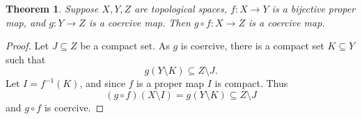 \documentclass[12pt]{article}
\newtheorem{thm}{Theorem}
\begin{document}
\begin{thm} Suppose $X,Y,Z$ are topological spaces,
$f\colon X\to Y$ is a bijective proper map, and 
$g\colon Y\to Z$ is a coercive map.
Then $g\circ f\colon X\to Z$ is a coercive map.
\end{thm}

\begin{proof}
Let $J\subseteq Z$ be a compact set. As $g$ is coercive, there
is a compact set $K\subseteq Y$ such that 
$$
   g(Y\setminus K) \subseteq Z\setminus J.
$$
Let $I=f^{-1}(K)$, and since $f$ is a proper map $I$ is compact.
Thus
$$
   (g\circ f) (X\setminus I) = g(Y\setminus K) \subseteq Z\setminus J
$$
and $g\circ f$ is coercive.
\end{proof}
\end{document}
